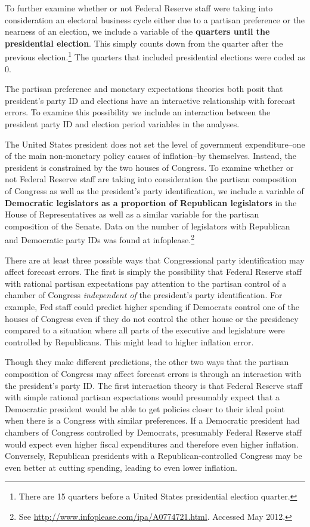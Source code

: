 \documentclass[a4paper]{article}\usepackage{graphicx, color}
\begin{document}
To further examine whether or not Federal Reserve staff were taking into consideration an electoral business cycle either due to a partisan preference or the nearness of an election, we include a variable of the {\bf{quarters until the presidential election}}. This simply counts down from the quarter after the previous election.\footnote{There are 15 quarters before a United States presidential election quarter.} The quarters that included presidential elections were coded as 0. 

The partisan preference and monetary expectations theories both posit that president's party ID and elections have an interactive relationship with forecast errors. To examine this possibility we include an interaction between the president party ID and election period variables in the analyses.

The United States president does not set the level of government expenditure--one of the main non-monetary policy causes of inflation--by themselves. Instead, the president is constrained by the two houses of Congress. To examine whether or not Federal Reserve staff are taking into consideration the partisan composition of Congress as well as the president's party identification, we include a variable of {\bf{Democratic legislators as a proportion of Republican legislators}} in the House of Representatives as well as a similar variable for the partisan composition of the Senate. Data on the number of legislators with Republican and Democratic party IDs was found at infoplease.\footnote{See {\url{http://www.infoplease.com/ipa/A0774721.html}}. Accessed May 2012.} 

There are at least three possible ways that Congressional party identification may affect forecast errors. The first is simply the possibility that Federal Reserve staff with rational partisan expectations pay attention to the partisan control of a chamber of Congress {\emph{independent of}} the president's party identification.  For example, Fed staff could predict higher spending if Democrats control one of the houses of Congress even if they do not control the other house or the presidency compared to a situation where all parts of the executive and legislature were controlled by Republicans. This might lead to higher inflation error.

Though they make different predictions, the other two ways that the partisan composition of Congress may affect forecast errors is through an interaction with the president's party ID. The first interaction theory is that Federal Reserve staff with simple rational partisan expectations would presumably expect that a Democratic president would be able to get policies closer to their ideal point when there is a Congress with similar preferences. If a Democratic president had chambers of Congress controlled by Democrats, presumably Federal Reserve staff would expect even higher fiscal expenditures and therefore even higher inflation. Conversely, Republican presidents with a Republican-controlled Congress may be even better at cutting spending, leading to even lower inflation.
\end{document}
